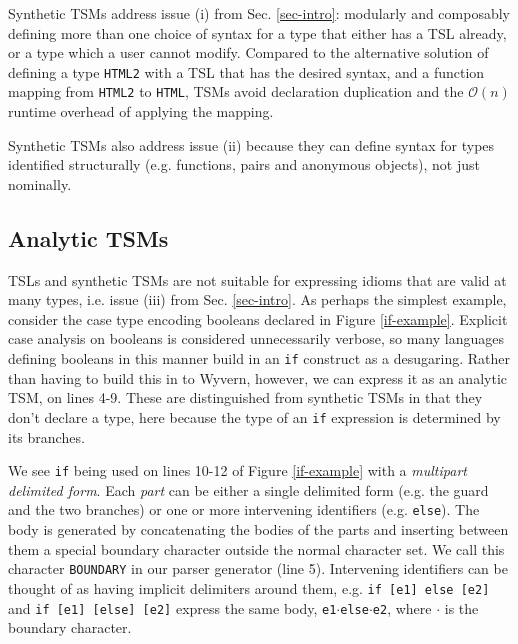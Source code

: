 \documentclass{sig-alternate}[10pt]
\newcommand{\lstinlinew}[1]{\lstinline[style=wyvern]{#1}}
\begin{document}
 Synthetic TSMs address issue (i) from Sec. \ref{sec-intro}: modularly and composably defining more than one choice of syntax for a type that either has a TSL  already, or a type which a user cannot modify. Compared to the alternative solution of defining a type \lstinlinew{HTML2} with a TSL that has the desired syntax, and a function mapping from \lstinlinew{HTML2} to \lstinlinew{HTML},  TSMs avoid declaration duplication and  the $\mathcal{O}(n)$ runtime overhead of applying the mapping. %

Synthetic TSMs also address issue (ii) because they can define syntax for types identified structurally (e.g. functions, pairs and anonymous objects), not just nominally.





\subsection{Analytic TSMs}
TSLs and synthetic TSMs are not suitable for expressing idioms that are valid at many types, i.e. issue (iii) from Sec. \ref{sec-intro}. As perhaps the simplest example, consider the case type encoding booleans declared in Figure \ref{if-example}. Explicit case analysis on booleans is considered unnecessarily verbose, so many languages defining booleans in this manner build in an \lstinlinew{if} construct as a desugaring. Rather than having to build this in to Wyvern, however, we can express it as an analytic TSM, on lines 4-9. These are distinguished from synthetic TSMs in that they don't declare a type, here because the type of an \lstinlinew{if} expression is determined by its branches. 

We see \lstinlinew{if} being used on lines 10-12 of Figure \ref{if-example} with a \emph{multipart delimited form}. Each \emph{part} can be either a single delimited form (e.g. the guard and the two branches) or one or more intervening identifiers (e.g. \lstinlinew{else}). The body is generated by concatenating the bodies of the parts and inserting between them a special boundary character outside the normal character set. We call this character \lstinlinew{BOUNDARY} in our parser generator (line 5). Intervening identifiers can be thought of as having implicit delimiters around them, e.g. \lstinlinew{if [e1] else [e2]} and \lstinlinew{if [e1] [else] [e2]} express the same body, \texttt{e1}$\cdot$\lstinlinew{else}$\cdot$\lstinlinew{e2}, where $\cdot$ is the boundary character.
\end{document}
